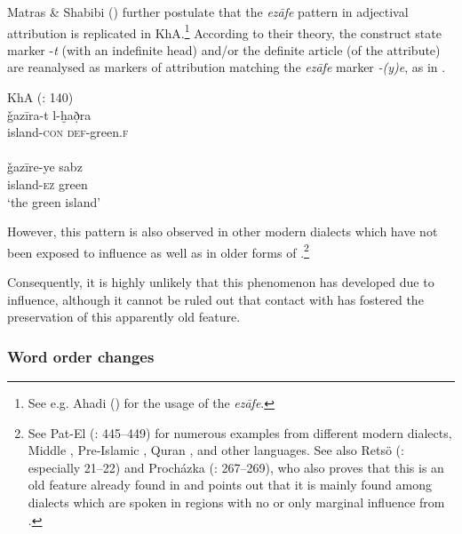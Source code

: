 \documentclass[output=paper,nonflat]{langsci/langscibook}
\begin{document}
Matras \& Shabibi (\citeyear[140]{MatrasShabibi2007}) further postulate that the  \textit{ezāfe} pattern in adjectival attribution is replicated in KhA.\footnote{See e.g. Ahadi (\citeyear[103–109]{Ahadi2001}) for the usage of the  \textit{ezāfe}.} According to their theory, the construct state marker -\textit{t} (with an indefinite head) and/or the {definite} {article} (of the attribute) are reanalysed as markers of attribution matching the   \textit{ezāfe} marker \textit{-(y)e}, as in . 

\ea\label{island}
\ea
{KhA (\citealt{MatrasShabibi2007}: 140)}\\
\gll ǧazīra-t l-ḫað̣ra \\
     island-\textsc{con} \textsc{def}-green.\textsc{f}\\
 
\\
\gll ǧazīre-ye sabz\\
     island-\textsc{ez} green\\
\glt ‘the green island’ 
\z\z

However, this pattern is also observed in other modern  dialects which have not been exposed to  influence as well as in older forms of .\footnote{See Pat-El (\citeyear{Pat-El2017}: 445–449) for numerous examples from different modern  dialects, Middle , Pre-Islamic , {Quran} , and other  languages. See also Retsö (\citeyear{Retsö2009}: especially 21–22) and Procházka (\citeyear{Procházka2018Fertile}: 267–269), who also proves that this is an old feature already found in   and points out that it is mainly found among dialects which are spoken in regions with no or only marginal influence from  .} 

Consequently, it is highly unlikely that this phenomenon has developed due to  influence, although it cannot be ruled out that contact with  has fostered the preservation of this apparently old feature. 


\subsubsection{Word order changes} \label{woc}
\end{document}
